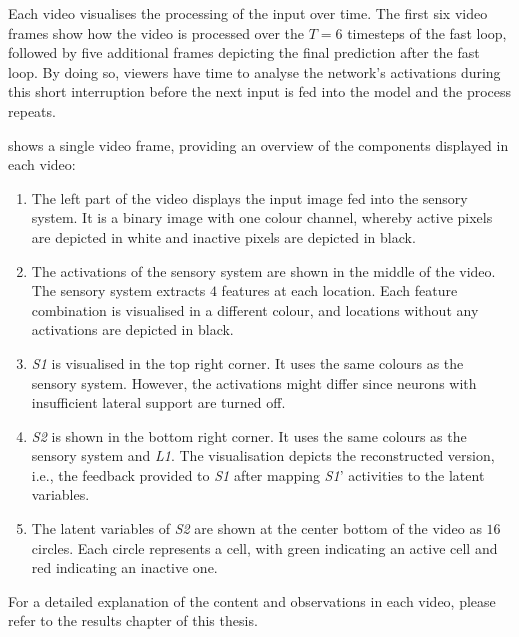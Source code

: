 Each video visualises the processing of the input over time.
The first six video frames show how the video is processed over the $T=6$ timesteps of the fast loop, followed by five additional frames depicting the final prediction after the fast loop.
By doing so, viewers have time to analyse the network's activations during this short interruption before the next input is fed into the model and the process repeats.

 shows a single video frame, providing an overview of the components displayed in each video:
\begin{enumerate}
    \item The left part of the video displays the input image fed into the sensory system. It is a binary image with one colour channel, whereby active pixels are depicted in white and inactive pixels are depicted in black.
    \item The activations of the sensory system are shown in the middle of the video. The sensory system extracts $4$ features at each location. Each feature combination is visualised in a different colour, and locations without any activations are depicted in black.
    \item \emph{S1} is visualised in the top right corner. It uses the same colours as the sensory system. However, the activations might differ since neurons with insufficient lateral support are turned off.
    \item \emph{S2} is shown in the bottom right corner. It uses the same colours as the sensory system and \emph{L1}. The visualisation depicts the reconstructed version, i.e., the feedback provided to \emph{S1} after mapping \emph{S1}' activities to the latent variables.
    \item The latent variables of \emph{S2} are shown at the center bottom of the video as $16$ circles. Each circle represents a cell, with green indicating an active cell and red indicating an inactive one. 
\end{enumerate}

For a detailed explanation of the content and observations in each video, please refer to the results chapter of this thesis.




